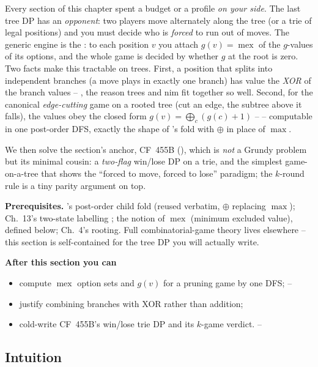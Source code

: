 \begin{topicintro}
Every section of this chapter spent a budget or a profile \emph{on your side}.
The last tree DP has an \emph{opponent}: two players move alternately along the
tree (or a trie of legal positions) and you must decide who is \emph{forced} to
run out of moves. The generic engine is the : to
each position $v$ you attach $g(v) = \operatorname{mex}$ of the $g$-values of its options, and
the whole game is decided by whether $g$ at the root is zero. Two facts make
this tractable on trees. First, a position that splits into independent branches
(a move plays in exactly one branch) has value the \emph{XOR} of the branch
values -- , the reason trees and nim fit together so well.
Second, for the canonical \emph{edge-cutting} game on a rooted tree (cut an edge,
the subtree above it falls), the values obey the closed form
$g(v) = \bigoplus_{c} (g(c) + 1)$ --  -- computable in one
post-order DFS, exactly the shape of 's fold with $\oplus$
in place of $\max$.

We then solve the section's anchor, CF~455B (), which is
\emph{not} a Grundy problem but its minimal cousin: a \emph{two-flag} win/lose DP
on a trie, and the simplest game-on-a-tree that shows the ``forced to move,
forced to lose'' paradigm; the $k$-round rule is a tiny parity argument on top.

\textbf{Prerequisites.} 's post-order child fold (reused
verbatim, $\oplus$ replacing $\max$); Ch.~13's two-state labelling
; the notion of $\operatorname{mex}$ (minimum excluded value), defined
below; Ch.~4's rooting. Full combinatorial-game theory lives elsewhere -- this
section is self-contained for the tree DP you will actually write.

\textbf{After this section you can}
\begin{itemize}[nosep]
  \item compute $\operatorname{mex}$ option sets and $g(v)$ for a pruning game by one DFS; \hfill{}--
  \item justify combining branches with XOR rather than addition; \hfill{}
  \item cold-write CF~455B's win/lose trie DP and its $k$-game verdict. \hfill{}--
\end{itemize}
\end{topicintro}

\subsection{Intuition}

